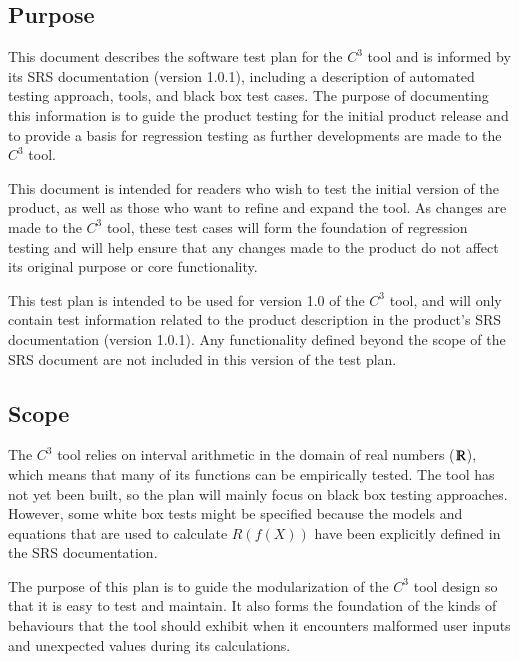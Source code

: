 \documentclass[12pt, titlepage]{article}
\newcommand{\prognameAbbrv}{$C^{3}$}
\newcommand{\srsVersion}{1.0.1}
\begin{document}
\subsection{Purpose}
This document describes the software test plan for the \prognameAbbrv{} tool 
and is informed by its SRS documentation (version \srsVersion{}), including a 
description of automated testing approach, tools, and black box test cases. The 
purpose of documenting this information is to guide the product testing for the 
initial product release and to provide a basis for regression testing as 
further developments are made to the \prognameAbbrv{} tool.

This document is intended for readers who wish to test the initial version of 
the product, as well as those who want to refine and expand the tool. As 
changes are made to the \prognameAbbrv{} tool, these test cases will form the 
foundation of regression testing and will help ensure that any changes made to 
the product do not affect its original purpose or core functionality.

This test plan is intended to be used for version 1.0 of the \prognameAbbrv{} 
tool, and will only contain test information related to the product description 
in the product's SRS documentation (version \srsVersion{}). Any functionality 
defined beyond the scope of the SRS document are not included in this version 
of the test plan.

\subsection{Scope}
The \prognameAbbrv{} tool relies on interval arithmetic in the domain of real 
numbers ($\varmathbb{R}$), which means that many of its functions can be 
empirically tested. The tool has not yet been built, so the plan will mainly 
focus on black box testing approaches. However, some white box tests might be 
specified because the models and equations that are used to calculate $R(f(X))$ 
have been explicitly defined in the SRS documentation.

The purpose of this plan is to guide the modularization of the \prognameAbbrv{} 
tool design so that it is easy to test and maintain. It also forms the 
foundation of the kinds of behaviours that the tool should exhibit when it 
encounters malformed  user inputs and unexpected values during its calculations.
\end{document}
